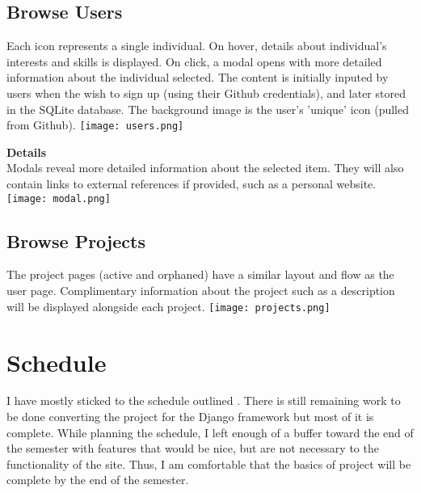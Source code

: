 \documentclass[11pt]{article}
\begin{document}
\subsection{Browse Users}
\begin{multicols}{2}
Each icon represents a single individual. 
On hover, details about individual's interests and skills is displayed. 
On click, a modal opens with more detailed information about the individual selected.
The content is initially inputed by users when the wish to sign up (using their Github credentials), and later stored in the SQLite database. The background image is the user's 'unique' icon (pulled from Github). 
\vspace*{10pt}
\columnbreak
\vspace*{5pt}
\texttt{[image: users.png]}
\end{multicols}

\begin{multicols}{2}
\textbf{Details}\\
Modals reveal more detailed information about the selected item. They will also contain links to external references if provided, such as a personal website.
\vspace{50pt}
\columnbreak
\texttt{[image: modal.png]}
\end{multicols}

\subsection{Browse Projects}
\begin{multicols}{2}
The project pages (active and orphaned) have a similar layout and flow as the user page. Complimentary information about the project such as a description will be displayed alongside each project.
\vspace{50pt}
\columnbreak
\texttt{[image: projects.png]}
\end{multicols}

\section{Schedule}
I have mostly sticked to the schedule outlined . There is still remaining work to be done converting the project for the Django framework but most of it is complete. While planning the schedule, I left enough of a buffer toward the end of the semester with features that would be nice, but are not necessary to the functionality of the site. Thus, I am comfortable that the basics of project will be complete by the end of the semester.
\end{document}
